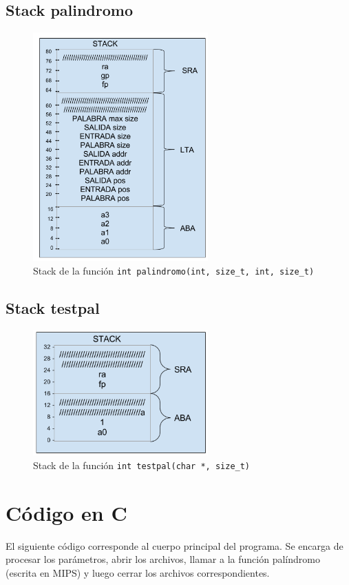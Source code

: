 \documentclass[11pt,a4paper]{article}
\begin{document}
\subsection{Stack palindromo}
\begin{figure}[H]
	\centering	
	\includegraphics[width=0.6\textwidth]{stack_palindromo}
	\caption{Stack de la función \texttt{int palindromo(int, size\_t, int, size\_t)}}
\end{figure}

\subsection{Stack testpal}
\begin{figure}[H]
	\centering	
	\includegraphics[width=0.6\textwidth]{stack_testpal}
	\caption{Stack de la función \texttt{int testpal(char *, size\_t)}}
\end{figure}




\section{Código en C}
El siguiente código corresponde al cuerpo principal del programa. Se encarga de procesar los parámetros, abrir los archivos, llamar a la función palíndromo (escrita en MIPS) y luego cerrar los archivos correspondientes.
\end{document}
